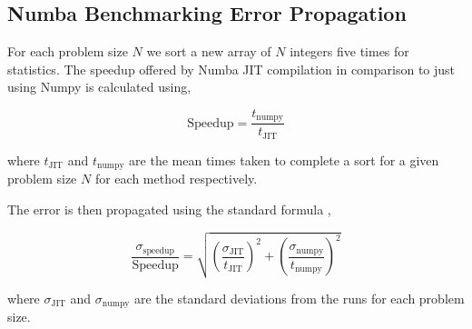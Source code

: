 \label{app:errors}

\subsection{Numba Benchmarking Error Propagation} \label{sec:app_numba}

For each problem size $N$ we sort a new array of $N$ integers five times for statistics.
The speedup offered by Numba JIT compilation in comparison to just using Numpy
is calculated using,

\begin{equation}
    \text{Speedup} = \frac{t_{\text{numpy}}}{t_{\text{JIT}}}
\end{equation}

where $t_{\text{JIT}}$ and $t_{\text{numpy}}$ are the mean times taken to complete
a sort for a given problem size $N$ for each method respectively.

The error is then propagated using the standard formula \cite{hughes2010measurements},

\begin{equation}
    \frac{\sigma_{\text{speedup}}}{\text{Speedup}} = \sqrt{
        \left ( \frac{\sigma_{\text{JIT}}}{t_{\text{JIT}}} \right )^2 +
        \left ( \frac{\sigma_{\text{numpy}}}{t_{\text{numpy}}} \right )^2
    }
\end{equation}

where $\sigma_{\text{JIT}}$ and $\sigma_{\text{numpy}}$ are the standard deviations
from the runs for each problem size.

